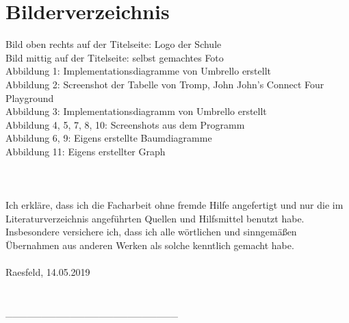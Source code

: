 \documentclass[12pt,a4paper]{article}
\begin{document}
	\section{Bilderverzeichnis}
	Bild oben rechts auf der Titelseite: Logo der Schule\\
	Bild mittig auf der Titelseite: selbst gemachtes Foto\\
	Abbildung 1: Implementationsdiagramme von \glqq Umbrello\grqq{} erstellt\\
	Abbildung 2: Screenshot der Tabelle von  Tromp, John  \glqq John's Connect Four Playground \grqq{}\\
	Abbildung 3: Implementationsdiagramm von \glqq Umbrello\grqq{} erstellt\\
	Abbildung 4, 5, 7, 8, 10: Screenshots aus dem Programm\\
	Abbildung 6, 9: Eigens erstellte Baumdiagramme\\
	Abbildung 11: Eigens erstellter Graph\\
	\\\\\\
	Ich erkläre, dass ich die Facharbeit ohne fremde Hilfe angefertigt und nur die
	im Literaturverzeichnis angeführten Quellen und Hilfsmittel benutzt habe.
	Insbesondere versichere ich, dass ich alle wörtlichen und sinngemäßen
	Übernahmen aus anderen Werken als solche kenntlich gemacht habe.
	\\\\
	Raesfeld, 14.05.2019
	\\\\\\
	\_\_\_\_\_\_\_\_\_\_\_\_\_\_\_\_\_\_\_\_\_\_\_\_
\end{document}
